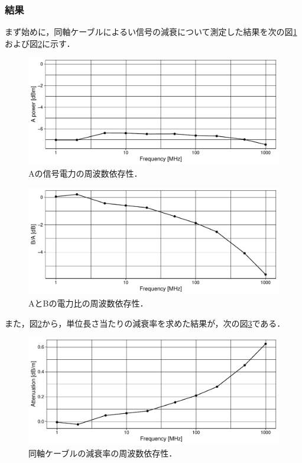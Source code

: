\documentclass[uplatex,dvipdfmx,a4j,12pt]{jsarticle}
\begin{document}
\subsubsection{結果}
まず始めに，同軸ケーブルによるい信号の減衰について測定した結果を次の図\ref{fig:1_1}および図\ref{fig:1_2}に示す．
\begin{figure}[H]
    \centering
    \includegraphics[width=0.9\linewidth]{data/1_1/power_vs_freq.pdf}
    \caption{Aの信号電力の周波数依存性．}
    \label{fig:1_1}
\end{figure}  

\begin{figure}[H]
  \centering
  \includegraphics[width=\linewidth]{data/1_1/power_ratio_vs_freq.pdf}
  \caption{AとBの電力比の周波数依存性．}
  \label{fig:1_2}        
\end{figure}

また，図\ref{fig:1_2}から，単位長さ当たりの減衰率を求めた結果が，次の図\ref{fig:1_3}である．
\begin{figure}[H]
  \centering
  \includegraphics[width=\linewidth]{data/1_1/decay_ratio_vs_freq.pdf}
  \caption{同軸ケーブルの減衰率の周波数依存性．}
  \label{fig:1_3}
\end{figure}
\end{document}
